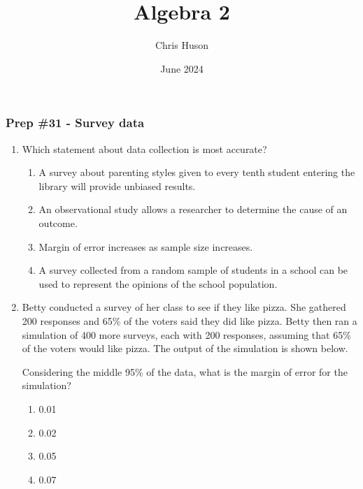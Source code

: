 \documentclass[12pt, twoside]{article}
\title{Algebra 2}
\author{Chris Huson}
\date{June 2024}
\begin{document}
\subsubsection*{Prep \#31 - Survey data}
\begin{enumerate}
\item Which statement about data collection is most accurate?
\begin{enumerate}
    \item A survey about parenting styles given to every tenth student entering the library will provide unbiased results.
    \item An observational study allows a researcher to determine the cause of an outcome.
    \item Margin of error increases as sample size increases.
    \item A survey collected from a random sample of students in a school can be used to represent the opinions of the school population.
\end{enumerate} %


\item Betty conducted a survey of her class to see if they like pizza. She gathered 200 responses and 65\% of the voters said they did like pizza. Betty then ran a simulation of 400 more surveys, each with 200 responses, assuming that 65\% of the voters would like pizza. The output of the simulation is shown below.
\begin{center}
    \end{center}
Considering the middle 95\% of the data, what is the margin of error for the simulation?
    \begin{multicols}{2}
        \begin{enumerate}
            \item 0.01
            \item 0.02
            \item 0.05
            \item 0.07
        \end{enumerate}
    \end{multicols} %


\end{enumerate}
\end{document}
